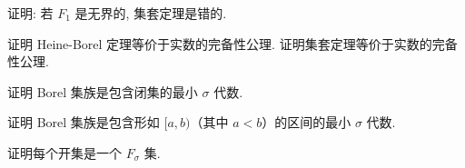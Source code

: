 \documentclass[../../main.tex]{subfiles}
\begin{document}
\begin{exercise}\label{exercise:ch01-33}
证明: 若 $F_{1}$ 是无界的, 集套定理是错的.
\end{exercise}

\begin{exercise}\label{exercise:ch01-34}
证明 Heine-Borel 定理等价于实数的完备性公理. 证明集套定理等价于实数的完备性公理.
\end{exercise}

\begin{exercise}\label{exercise:ch01-35}
证明 Borel 集族是包含闭集的最小 $\sigma$ 代数.
\end{exercise}

\begin{exercise}\label{exercise:ch01-36}
证明 Borel 集族是包含形如 $[a,b)$（其中 $a<b$）的区间的最小 $\sigma$ 代数.
\end{exercise}

\begin{exercise}\label{exercise:ch01-37}
证明每个开集是一个 $F_{\sigma}$ 集.
\end{exercise}
\end{document}

